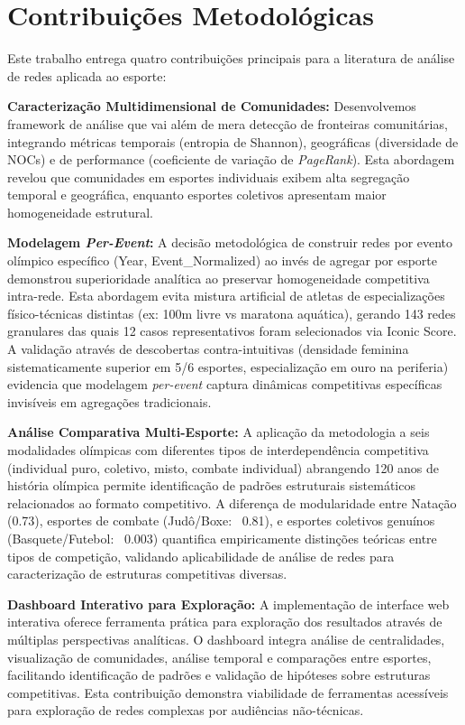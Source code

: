 \section{Contribuições Metodológicas}

Este trabalho entrega quatro contribuições principais para a literatura de análise de redes aplicada ao esporte:

\textbf{Caracterização Multidimensional de Comunidades:} Desenvolvemos framework de análise que vai além de mera detecção de fronteiras comunitárias, integrando métricas temporais (entropia de Shannon), geográficas (diversidade de NOCs) e de performance (coeficiente de variação de \textit{PageRank}{}). Esta abordagem revelou que comunidades em esportes individuais exibem alta segregação temporal e geográfica, enquanto esportes coletivos apresentam maior homogeneidade estrutural.

\textbf{Modelagem \textit{Per-Event}:} A decisão metodológica de construir redes por evento olímpico específico (Year, Event\_Normalized) ao invés de agregar por esporte demonstrou superioridade analítica ao preservar homogeneidade competitiva intra-rede. Esta abordagem evita mistura artificial de atletas de especializações físico-técnicas distintas (ex: 100m livre vs maratona aquática), gerando 143 redes granulares das quais 12 casos representativos foram selecionados via Iconic Score. A validação através de descobertas contra-intuitivas (densidade feminina sistematicamente superior em 5/6 esportes, especialização em ouro na periferia) evidencia que modelagem \textit{per-event} captura dinâmicas competitivas específicas invisíveis em agregações tradicionais.

\textbf{Análise Comparativa Multi-Esporte:} A aplicação da metodologia a seis modalidades olímpicas com diferentes tipos de interdependência competitiva (individual puro, coletivo, misto, combate individual) abrangendo 120 anos de história olímpica permite identificação de padrões estruturais sistemáticos relacionados ao formato competitivo. A diferença de modularidade entre Natação (0.73), esportes de combate (Judô/Boxe: ~0.81), e esportes coletivos genuínos (Basquete/Futebol: ~0.003) quantifica empiricamente distinções teóricas entre tipos de competição, validando aplicabilidade de análise de redes para caracterização de estruturas competitivas diversas.

\textbf{Dashboard Interativo para Exploração:} A implementação de interface web interativa oferece ferramenta prática para exploração dos resultados através de múltiplas perspectivas analíticas. O dashboard integra análise de centralidades, visualização de comunidades, análise temporal e comparações entre esportes, facilitando identificação de padrões e validação de hipóteses sobre estruturas competitivas. Esta contribuição demonstra viabilidade de ferramentas acessíveis para exploração de redes complexas por audiências não-técnicas.

